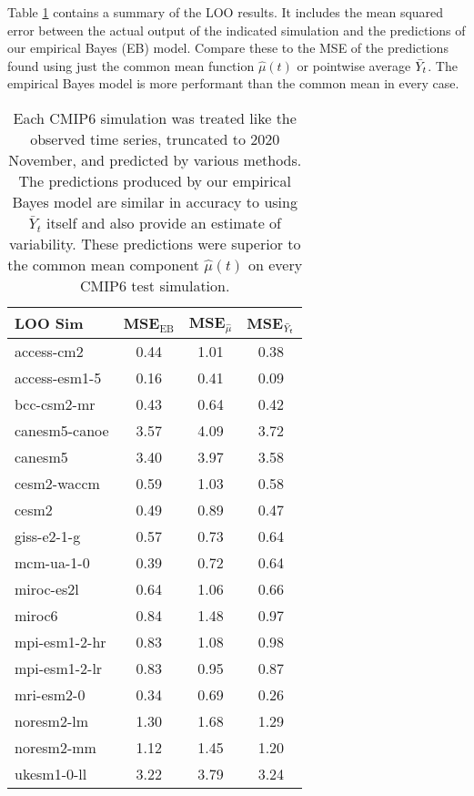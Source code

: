 \documentclass{CUP-JNL-EDS}
\begin{document}
Table \ref{tab:loo_mse} contains a summary of the LOO results. It includes the mean squared error between the actual output of the indicated simulation and the predictions of our empirical Bayes (EB) model. Compare these to the MSE of the predictions found using just the common mean function $\hat{\mu}(t)$ or pointwise average $\Bar{Y}_t$. The empirical Bayes model is more performant than the common mean in every case.
\vspace{-0.2cm}
\begin{table}[h]
\small
    \centering
    \begin{tabular}{l | c c c}
     LOO Sim &  MSE$_{\operatorname{EB}}$ & MSE$_{\hat{\mu}}$ & MSE$_{\Bar{Y}_{t}}$ \\
     \hline
    access-cm2      & 0.44 & 1.01 & 0.38 \\
    access-esm1-5   & 0.16 & 0.41 & 0.09 \\
    bcc-csm2-mr     & 0.43 & 0.64 & 0.42 \\
    canesm5-canoe   & 3.57 & 4.09 & 3.72 \\
    canesm5         & 3.40 & 3.97 & 3.58 \\ 
    cesm2-waccm     & 0.59 & 1.03 & 0.58 \\
    cesm2           & 0.49 & 0.89 & 0.47 \\
    giss-e2-1-g     & 0.57 & 0.73 & 0.64 \\
    mcm-ua-1-0      & 0.39 & 0.72 & 0.64 \\
    miroc-es2l      & 0.64 & 1.06 & 0.66 \\
    miroc6          & 0.84 & 1.48 & 0.97 \\
    mpi-esm1-2-hr   & 0.83 & 1.08 & 0.98 \\
    mpi-esm1-2-lr   & 0.83 & 0.95 & 0.87 \\
    mri-esm2-0      & 0.34 & 0.69 & 0.26 \\
    noresm2-lm      & 1.30 & 1.68 & 1.29 \\
    noresm2-mm      & 1.12 & 1.45 & 1.20 \\
    ukesm1-0-ll     & 3.22 & 3.79 & 3.24 
    \end{tabular}
    \caption{Each CMIP6 simulation was treated like the observed time series, truncated to 2020 November, and predicted by various methods. The predictions produced by our empirical Bayes model are similar in accuracy to using $\bar{Y}_{t}$ itself and also provide an estimate of variability. These predictions were superior to the common mean component $\hat{\mu}(t)$ on every CMIP6 test simulation.}
    \label{tab:loo_mse}
\end{table}
\end{document}
